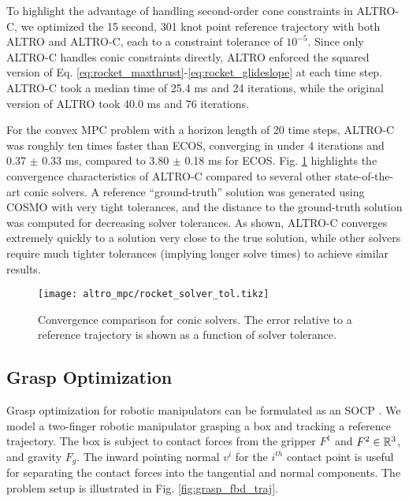 \documentclass[../root.tex]{subfiles}
\begin{document}
To highlight the advantage of handling second-order cone constraints
in ALTRO-C, we optimized the 15 second, 301 knot point reference trajectory
with both ALTRO and ALTRO-C, each to a constraint tolerance of $10^{-5}$.
Since only ALTRO-C handles conic constraints directly, ALTRO enforced the
squared version of Eq.
\eqref{eq:rocket_maxthrust}-\eqref{eq:rocket_glideslope} at each time step.
ALTRO-C took a median time of 25.4 ms and 24 iterations, while the original
version of ALTRO took 40.0 ms and 76 iterations.

For the convex MPC problem with a horizon length of 20 time steps,
ALTRO-C was roughly ten times faster than ECOS, converging in under 4
iterations and 0.37 $\pm$ 0.33 ms, compared to 3.80 $\pm$ 0.18 ms for ECOS.
Fig. \ref{fig:tol_comp} highlights the convergence characteristics of ALTRO-C
compared to several other state-of-the-art conic solvers. A reference
``ground-truth'' solution was generated using COSMO \cite{garstka_COSMO_2019}
with very tight tolerances, and the distance to the ground-truth solution was
computed for decreasing solver tolerances. As shown, ALTRO-C converges
extremely quickly to a solution very close to the true solution, while other
solvers require much tighter tolerances (implying longer solve times) to
achieve similar results.

\begin{figure}
    \centering
    \texttt{[image: altro\_mpc/rocket\_solver\_tol.tikz]}
    \caption{Convergence comparison for conic solvers. The error relative to
    a reference trajectory is shown as a function of solver tolerance.}
    \label{fig:tol_comp}
\end{figure}

\subsection{Grasp Optimization}
Grasp optimization for robotic manipulators can be formulated as an SOCP \cite{lobo_Applications_1998}.
We model a two-finger robotic manipulator grasping a box and tracking a
reference trajectory. The box is subject to contact forces from the gripper
$F^1$ and $F^2 \in \mathbb{R}^{3}$, and gravity $F_g$. The inward pointing normal $v^i$
for the $i^{th}$ contact point is useful for separating the contact forces
into the tangential and normal components. The problem setup is illustrated
in Fig. \ref{fig:grasp_fbd_traj}.
\end{document}
